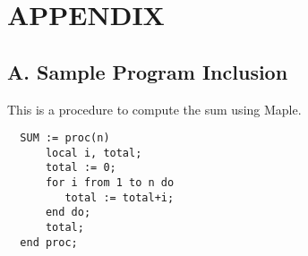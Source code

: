 \newpage
\section*{APPENDIX}

\subsection*{A. Sample Program Inclusion}

This is a procedure to compute the sum using Maple.
\begin{verbatim}
  SUM := proc(n)
      local i, total;
      total := 0;
      for i from 1 to n do
         total := total+i;
      end do;
      total;
  end proc;
\end{verbatim}
